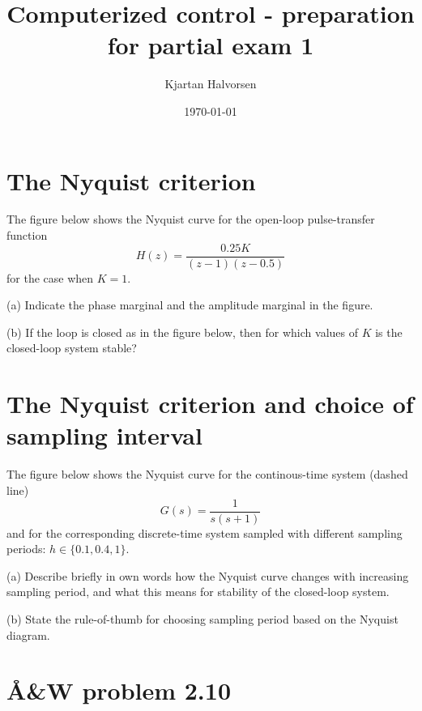 \documentclass{scrartcl}
\title{Computerized control - preparation for partial exam 1}
\author{Kjartan Halvorsen}
\date{\today}
\begin{document}
\maketitle



\section*{The Nyquist criterion}
\label{sec-1}

The figure below shows the Nyquist curve for the open-loop pulse-transfer function 
\[ H(z) = \frac{0.25K}{(z-1)(z-0.5)} \]
for the case when $K=1$. 
\begin{center}

\end{center}

(a) Indicate the phase marginal and the amplitude marginal in the figure.

(b) If the loop is closed as in the figure below, then for which values of $K$ is the closed-loop system stable?
\begin{center}

\end{center}
\section*{The Nyquist criterion and choice of sampling interval}
\label{sec-2}

The figure below shows the Nyquist curve for the continous-time system (dashed line)
\[ G(s) = \frac{1}{s(s+1)} \]
and for the corresponding discrete-time system sampled with different sampling periods: $h \in \{0.1, 0.4, 1 \}$. 
\begin{center}

\end{center}

(a) Describe briefly in own words how the Nyquist curve changes with increasing sampling period, and what this means for stability of the closed-loop system. 

(b) State the rule-of-thumb for choosing sampling period based on the Nyquist diagram.
\section*{Å\&W problem 2.10}
\label{sec-3}
\end{document}
